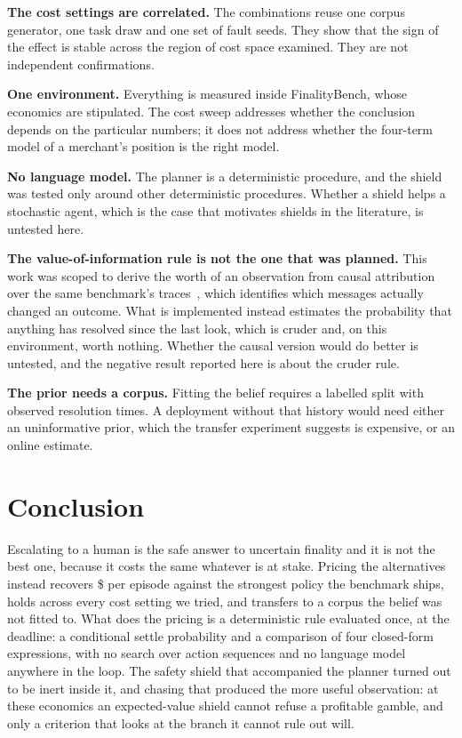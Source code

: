 \documentclass[conference]{IEEEtran}
\begin{document}
\textbf{The cost settings are correlated.} The \costSettings{} combinations
reuse one corpus generator, one task draw and one set of fault seeds. They show
that the sign of the effect is stable across the region of cost space examined.
They are not \costSettings{} independent confirmations.

\textbf{One environment.} Everything is measured inside FinalityBench, whose
economics are stipulated. The cost sweep addresses whether the conclusion
depends on the particular numbers; it does not address whether the four-term
model of a merchant's position is the right model.

\textbf{No language model.} The planner is a deterministic procedure, and the
shield was tested only around other deterministic procedures. Whether a shield
helps a stochastic agent, which is the case that motivates shields in the
literature, is untested here.

\textbf{The value-of-information rule is not the one that was planned.} This
work was scoped to derive the worth of an observation from causal attribution
over the same benchmark's traces~\cite{causalloss}, which identifies which
messages actually changed an outcome. What is implemented instead estimates the
probability that anything has resolved since the last look, which is cruder and,
on this environment, worth nothing. Whether the causal version would do better
is untested, and the negative result reported here is about the cruder rule.

\textbf{The prior needs a corpus.} Fitting the belief requires a labelled split
with observed resolution times. A deployment without that history would need
either an uninformative prior, which the transfer experiment suggests is
expensive, or an online estimate.

\section{Conclusion}

Escalating to a human is the safe answer to uncertain finality and it is not the
best one, because it costs the same whatever is at stake. Pricing the
alternatives instead recovers \$\vsGateReduction{} per episode against the
strongest policy the benchmark ships, holds across every cost setting we tried,
and transfers to a corpus the belief was not fitted to. What does the pricing is
a deterministic rule evaluated once, at the deadline: a conditional settle
probability and a comparison of four closed-form expressions, with no search
over action sequences and no language model anywhere in the loop. The safety shield that
accompanied the planner turned out to be inert inside it, and chasing that
produced the more useful observation: at these economics an expected-value
shield cannot refuse a profitable gamble, and only a criterion that looks at the
branch it cannot rule out will.
\end{document}
